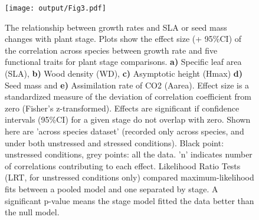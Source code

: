 \documentclass[a4paper]{article}\usepackage[]{graphicx}\usepackage[]{color}
\begin{document}
\begin{figure}[h!]
\centering
\texttt{[image: output/Fig3.pdf]}
\caption{The relationship between growth rates and SLA or seed mass changes with plant stage. Plots show the effect size (+ 95\%CI) of the correlation across species between growth rate and five functional traits for plant stage comparisons. \textbf{a)} Specific leaf area (SLA), \textbf{b)} Wood density (WD), \textbf{c)} Asymptotic height (Hmax) \textbf{d)} Seed mass and \textbf{e)} Assimilation rate of CO2 (Aarea). Effect size is a standardized measure of the deviation of correlation coefficient from zero (Fisher's z-transformed). Effects are significant if confidence intervals (95\%CI) for a given stage do not overlap with zero. Shown here are 'across species dataset' (recorded only across species, and under both unstressed and stressed conditions). Black point: unstressed conditions, grey points: all the data. 'n' indicates number of correlations contributing to each effect. Likelihood Ratio Tests (LRT, for unstressed conditions only) compared maximum-likelihood fits between a pooled model and one separated by stage. A significant p-value means the stage model fitted the data better than the null model. 
}
\label{Fig3}
\end{figure}

\clearpage
\end{document}

